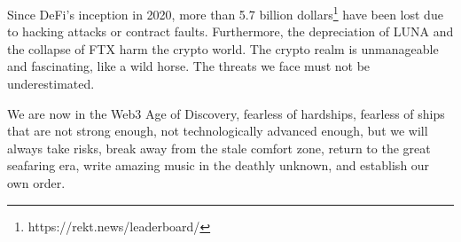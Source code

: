 Since DeFi's inception in 2020, more than 5.7 billion dollars\footnote{https://rekt.news/leaderboard/} have been lost due to hacking attacks or contract faults.
Furthermore, the depreciation of LUNA and the collapse of FTX harm the crypto world.
The crypto realm is unmanageable and fascinating, like a wild horse.
The threats we face must not be underestimated.

We are now in the Web3 Age of Discovery, fearless of hardships, fearless of ships that are not strong enough, not technologically advanced enough, but we will always take risks, break away from the stale comfort zone, return to the great seafaring era, write amazing music in the deathly unknown, and establish our own order.
